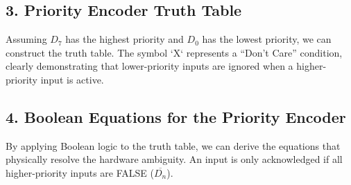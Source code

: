 \documentclass[12pt,a3paper]{article}
\begin{document}
\begin{enumerate}
\begin{tcolorbox}[enhanced,breakable,ansbox,colback=cD!4,colframe=cD,boxrule=0.8pt,arc=5pt,title={\textbf{Answer}},fonttitle=\bfseries\color{white},colbacktitle=cD]
\subsection*{3. Priority Encoder Truth Table}

Assuming $D_7$ has the highest priority and $D_0$ has the lowest priority, we can construct the truth table. The symbol `X` represents a ``Don't Care'' condition, clearly demonstrating that lower-priority inputs are ignored when a higher-priority input is active.

\begin{center}
\renewcommand{\arraystretch}{1.15}
\end{center}

\subsection*{4. Boolean Equations for the Priority Encoder}

By applying Boolean logic to the truth table, we can derive the equations that physically resolve the hardware ambiguity. An input is only acknowledged if all higher-priority inputs are FALSE ($\overline{D_n}$).


\end{tcolorbox}
\end{enumerate}
\end{document}
